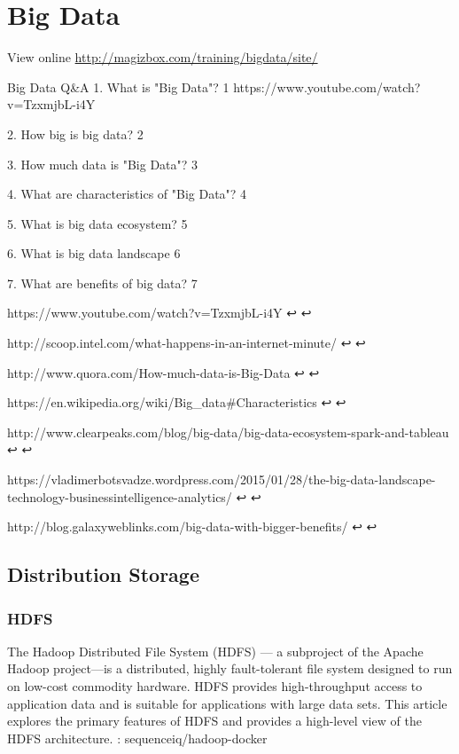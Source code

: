 \chapter{Big Data}

View online \href{http://magizbox.com/training/bigdata/site/}{http://magizbox.com/training/bigdata/site/}

Big Data Q&A
1. What is "Big Data"? 1
https://www.youtube.com/watch?v=TzxmjbL-i4Y

2. How big is big data? 2


3. How much data is "Big Data"? 3


4. What are characteristics of "Big Data"? 4


5. What is big data ecosystem? 5


6. What is big data landscape 6


7. What are benefits of big data? 7


https://www.youtube.com/watch?v=TzxmjbL-i4Y ↩ ↩

http://scoop.intel.com/what-happens-in-an-internet-minute/ ↩ ↩

http://www.quora.com/How-much-data-is-Big-Data ↩ ↩

https://en.wikipedia.org/wiki/Big_data#Characteristics ↩ ↩

http://www.clearpeaks.com/blog/big-data/big-data-ecosystem-spark-and-tableau ↩ ↩

https://vladimerbotsvadze.wordpress.com/2015/01/28/the-big-data-landscape-technology-businessintelligence-analytics/ ↩ ↩

http://blog.galaxyweblinks.com/big-data-with-bigger-benefits/ ↩ ↩

\section{Distribution Storage}

\subsection{HDFS}

The Hadoop Distributed File System (HDFS) — a subproject of the Apache Hadoop project—is a distributed, highly fault-tolerant file system designed to run on low-cost commodity hardware. HDFS provides high-throughput access to application data and is suitable for applications with large data sets. This article explores the primary features of HDFS and provides a high-level view of the HDFS architecture.
: sequenceiq/hadoop-docker

